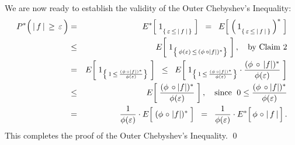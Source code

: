 \vskip 0.5cm
\noindent
We are now ready to establish the validity of the Outer Chebyshev's Inequality:
\begin{eqnarray*}
P^{*}\!\left(\,\vert\,\overset{{\color{white}.}}{f}\,\vert\,\geq\,\varepsilon\,\right)
&=&
	E^{*}\!\left[\;1_{\{\,\varepsilon\,\leq\,\vert\,\overset{{\color{white}.}}{f}\,\vert\,\}}\;\right]
\;\;=\;\;
	E\!\left[\;\left(\,1_{\{\,\varepsilon\,\leq\,\vert\,\overset{{\color{white}.}}{f}\,\vert\,\}}\,\right)^{*}\;\right]
\\
&\leq&
	E\!\left[\;1_{\left\{\,\phi(\varepsilon)\,\overset{{\color{white}.}}{\leq}\,(\phi\,\circ\vert f \vert)^{*}\right\}}\;\right],
	\quad
	\textnormal{by Claim 2}
\\
&=&
	E\!\left[\;1_{\left\{\,1\,\leq\,\frac{(\phi\,\circ\vert f \vert)^{*}}{\phi(\varepsilon)}\right\}}\;\right]
\;\;\leq\;\;
	E\!\left[\;
		1_{\left\{\,1\,\leq\,\frac{(\phi\,\circ\vert f \vert)^{*}}{\phi(\varepsilon)}\right\}}
		\cdot
		\dfrac{(\phi\,\circ\,\vert f \vert)^{*}}{\phi(\varepsilon)}
		\;\right]
\\
&\leq&
	E\!\left[\; \dfrac{(\phi\,\circ\vert f \vert)^{*}}{\phi(\varepsilon)} \;\right],
	\quad
	\textnormal{since \;$0 \leq \dfrac{(\phi\,\circ\vert f \vert)^{*}}{\phi(\varepsilon)}$}
\\
&=&
	\dfrac{1}{\phi(\varepsilon)} \cdot E\!\left[\; (\phi\overset{{\color{white}-}}{\circ}\vert f \vert)^{*} \;\right]
\;\;=\;\;
	\dfrac{1}{\phi(\varepsilon)} \cdot E^{*}\!\left[\,\phi\overset{{\color{white}-}}{\circ}\vert\,f\,\vert\,\right].
\end{eqnarray*}
This completes the proof of the Outer Chebyshev's Inequality.
\qed



\renewcommand{\theenumi}{\roman{enumi}}
\renewcommand{\labelenumi}{\textnormal{(\theenumi)}$\;\;$}

